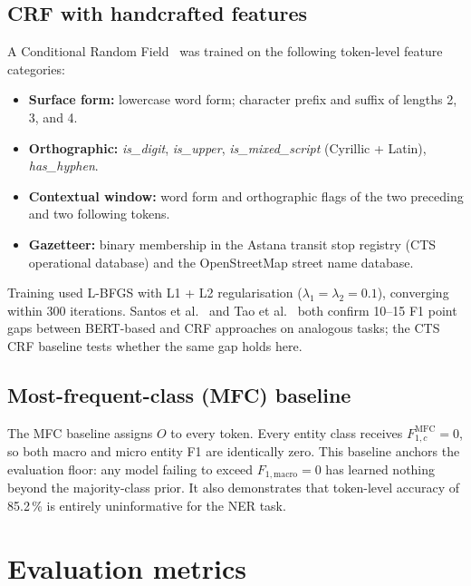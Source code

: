 \subsection{CRF with handcrafted features}
\label{sec:crf_baseline}

A Conditional Random Field~\cite{lafferty2001crf} was trained on the following token-level feature categories:

\begin{itemize}
  \item \textbf{Surface form:} lowercase word form; character prefix and suffix of lengths 2, 3, and 4.
  \item \textbf{Orthographic:} \textit{is\_digit}, \textit{is\_upper}, \textit{is\_mixed\_script} (Cyrillic + Latin), \textit{has\_hyphen}.
  \item \textbf{Contextual window:} word form and orthographic flags of the two preceding and two following tokens.
  \item \textbf{Gazetteer:} binary membership in the Astana transit stop registry (CTS operational database) and the OpenStreetMap street name database.
\end{itemize}

Training used L-BFGS with L1 + L2 regularisation ($\lambda_1 = \lambda_2 = 0.1$), converging within 300 iterations. Santos et al.~\cite{santos2021address} and Tao et al.~\cite{tao2022socialNER} both confirm 10--15 F1 point gaps between BERT-based and CRF approaches on analogous tasks; the CTS CRF baseline tests whether the same gap holds here.

\subsection{Most-frequent-class (MFC) baseline}
\label{sec:mfc_baseline}

The MFC baseline assigns $O$ to every token. Every entity class receives $F_{1,c}^{\text{MFC}} = 0$, so both macro and micro entity F1 are identically zero. This baseline anchors the evaluation floor: any model failing to exceed $F_{1,\text{macro}} = 0$ has learned nothing beyond the majority-class prior. It also demonstrates that token-level accuracy of 85.2\,\% is entirely uninformative for the NER task.

\section{Evaluation metrics}
\label{sec:metrics}

